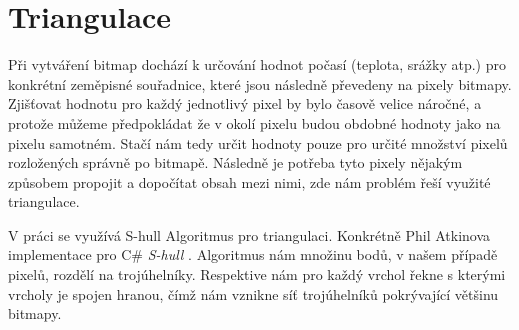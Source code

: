 \documentclass[czech,bachelor,dept460,male,csharp,cpdeclaration]{diploma}
\begin{document}
	\section{Triangulace}
	
	Při vytváření bitmap dochází k určování hodnot počasí (teplota, srážky atp.) pro konkrétní zeměpisné souřadnice, které jsou následně převedeny na pixely bitmapy. Zjišťovat hodnotu pro každý jednotlivý pixel by bylo časově velice náročné, a protože můžeme předpokládat že v okolí pixelu budou obdobné hodnoty jako na pixelu samotném. Stačí nám tedy určit hodnoty pouze pro určité množství pixelů rozložených správně po bitmapě. Následně je potřeba tyto pixely nějakým způsobem propojit a dopočítat obsah mezi nimi, zde nám problém řeší využité triangulace.
	
	V práci se využívá S-hull Algoritmus pro triangulaci. Konkrétně Phil Atkinova implementace pro C\# \emph{S-hull} \cite{shull}. Algoritmus nám množinu bodů, v našem případě pixelů, rozdělí na trojúhelníky. Respektive nám pro každý vrchol řekne s kterými vrcholy je spojen hranou, čímž nám vznikne síť trojúhelníků pokrývající většinu bitmapy.
	
	
\end{document}
